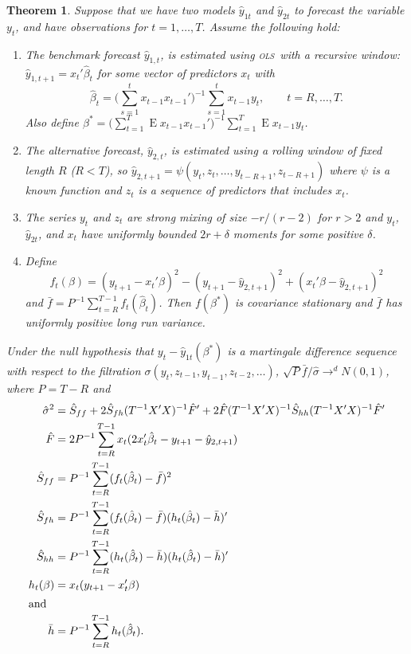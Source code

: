 \documentclass[12pt]{article}
\newtheorem{thm}{Theorem}
\DeclareMathOperator{\E}{E}
\newcommand{\ols}{\textsc{ols}}
\begin{document}
\begin{thm}\label{thm:1}
  Suppose that we have two models $\hat{y}_{1t}$ and $\hat{y}_{2t}$ to
  forecast the variable $y_t$, and have observations for
  $t=1,\dots,T$.  Assume the following hold:
  \begin{enumerate}
  \item The benchmark forecast $\hat{y}_{1,t}$, is estimated using
    \ols\ with a recursive window: $\hat{y}_{1,t+1} =
    x_t'\hat{\beta}_t$ for some vector of predictors $x_t$ with
    \[\hat{\beta}_t = \Big(\sum_{s=1}^{t} x_{t-1} x_{t-1}'\Big)^{-1}
    \sum_{s=1}^t x_{t-1} y_t, \qquad t = R,\dots,T.\]
    Also define $\beta^{*} = \big(\sum_{t=1}^{T} \E x_{t-1} x_{t-1}'\big)^{-1}
    \sum_{t=1}^T \E x_{t-1} y_t$.
  \item The alternative forecast, $\hat{y}_{2,t}$, is estimated using
    a rolling window of fixed length $R$ ($R < T$), so $\hat{y}_{2,t+1} =
    \psi(y_t,z_t,\dots,y_{t-R+1}, z_{t-R+1})$ where $\psi$ is a known
    function and $z_t$ is a sequence of predictors that includes $x_t$.
  \item The series $y_t$ and $z_t$ are strong mixing of size
    $-r/(r-2)$ for $r>2$ and $y_t$, $\hat{y}_{2t}$, and $x_t$ have
    uniformly bounded $2 r+\delta$ moments for some positive $\delta$.
  \item Define \[f_t(\beta) = (y_{t+1} - x_t'\beta)^2 - (y_{t+1} -
    \hat{y}_{2,t+1})^2 + (x_t'\beta - \hat{y}_{2,t+1})^2\] and $\bar f
    = P^{-1} \sum_{t=R}^{T-1} f_t(\hat{\beta}_t)$. Then $f(\beta^{*})$
    is covariance stationary and $\bar f$ has uniformly positive long
    run variance.
  \end{enumerate}
  Under the null hypothesis that $y_t - \hat{y}_{1t}(\beta^{*})$ is a
  martingale difference sequence with respect to the filtration
  $\sigma(y_t, z_{t-1}, y_{t-1}, z_{t-2},\dots)$, $\sqrt{P} \bar f /
  \hat{\sigma} \to^d N(0,1)$, where $P = T-R$ and
  \begin{align*}
    \hat{\sigma}^2 &= \hat{S}_{ff} + 2 \hat{S}_{fh} (T^{-1}X'X)^{-1}
    \hat{F}' +
    2\hat{F} (T^{-1} X'X)^{-1} \hat{S}_{hh} (T^{-1}X'X)^{-1} \hat{F}'\\
    \hat{F} &= 2 P^{-1} \sum_{t=R}^{T-1} x_t (2 x_t'\hat{\beta}_t -
    y_{t+1} - \hat{y}_{2,t+1}) \\
    \hat{S}_{ff} &= P^{-1}\sum_{t=R}^{T-1} (f_t(\hat{\beta}_t) - \bar
    f)^2 \\
    \hat{S}_{fh} &= P^{-1} \sum_{t=R}^{T-1} (f_t(\hat{\beta}_t) -
    \bar{f})(h_t(\hat{\beta}_t) - \bar h)' \\
    \hat{S}_{hh} &= P^{-1} \sum_{t=R}^{T-1} (h_t(\hat{\beta}_t) - \bar h)(h_t(\hat{\beta}_t) - \bar h)' \\
    h_t(\beta) &= x_t(y_{t+1} - x_t'\beta) \\
    \intertext{and} \bar h &= P^{-1} \sum_{t=R}^{T-1}
    h_t(\hat{\beta}_t).
  \end{align*}
\end{thm}
\end{document}
